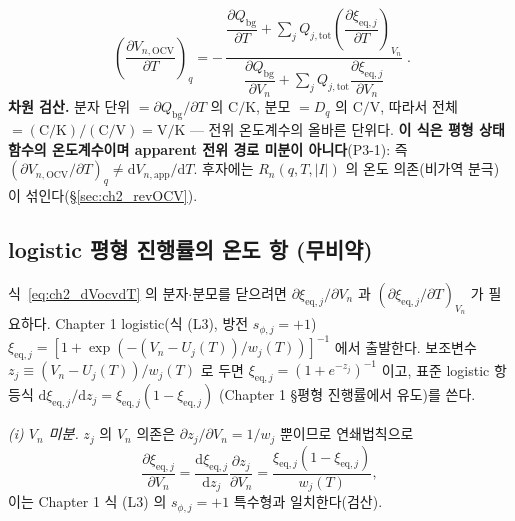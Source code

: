 \documentclass[11pt,a4paper]{article}
\newcommand{\dd}{\mathrm{d}}
\newcommand{\eq}{\mathrm{eq}}
\newcommand{\app}{\mathrm{app}}
\newcommand{\bg}{\mathrm{bg}}
\newcommand{\OCV}{\mathrm{OCV}}
\newcommand{\tot}{\mathrm{tot}}
\begin{document}
\begin{equation}
\boxed{\;\left(\frac{\partial V_{n,\OCV}}{\partial T}\right)_q
=-\,\frac{\dfrac{\partial Q_\bg}{\partial T}+\displaystyle\sum_{j}Q_{j,\tot}\left(\dfrac{\partial\xi_{\eq,j}}{\partial T}\right)_{V_n}}
{\dfrac{\partial Q_\bg}{\partial V_n}+\displaystyle\sum_{j}Q_{j,\tot}\dfrac{\partial\xi_{\eq,j}}{\partial V_n}}\;.}
\label{eq:ch2_dVocvdT}
\end{equation}
\textbf{차원 검산.} 분자 단위 $=\partial Q_\bg/\partial T$ 의 $\mathrm{C/K}$, 분모 $=D_q$ 의 $\mathrm{C/V}$,
따라서 전체 $=(\mathrm{C/K})/(\mathrm{C/V})=\mathrm{V/K}$ — 전위 온도계수의 올바른 단위다. \textbf{이 식은 평형
상태함수의 온도계수이며 apparent 전위 경로 미분이 아니다}(P3-1): 즉 $(\partial V_{n,\OCV}/\partial T)_q\ne
\dd V_{n,\app}/\dd T$. 후자에는 $R_n(q,T,|I|)$ 의 온도 의존(비가역 분극)이 섞인다(\S\ref{sec:ch2_revOCV}).

\subsection{logistic 평형 진행률의 온도 항 (무비약)}\label{sec:ch2_ocvT_logistic}
식~\eqref{eq:ch2_dVocvdT} 의 분자$\cdot$분모를 닫으려면 $\partial\xi_{\eq,j}/\partial V_n$ 과
$(\partial\xi_{\eq,j}/\partial T)_{V_n}$ 가 필요하다. Chapter 1 logistic(식 (L3), 방전 $s_{\phi,j}=+1$)
$\xi_{\eq,j}=[1+\exp(-(V_n-U_j(T))/w_j(T))]^{-1}$ 에서 출발한다. 보조변수 $z_j\equiv(V_n-U_j(T))/w_j(T)$ 로 두면
$\xi_{\eq,j}=(1+e^{-z_j})^{-1}$ 이고, 표준 logistic 항등식 $\dd\xi_{\eq,j}/\dd z_j=\xi_{\eq,j}(1-\xi_{\eq,j})$
(Chapter 1 \S 평형 진행률에서 유도)를 쓴다.

\emph{(i) $V_n$ 미분.} $z_j$ 의 $V_n$ 의존은 $\partial z_j/\partial V_n=1/w_j$ 뿐이므로 연쇄법칙으로
\begin{equation}
\frac{\partial\xi_{\eq,j}}{\partial V_n}=\frac{\dd\xi_{\eq,j}}{\dd z_j}\frac{\partial z_j}{\partial V_n}
=\frac{\xi_{\eq,j}(1-\xi_{\eq,j})}{w_j(T)},
\label{eq:ch2_dxidV}
\end{equation}
이는 Chapter 1 식 (L3) 의 $s_{\phi,j}=+1$ 특수형과 일치한다(검산).
\end{document}

